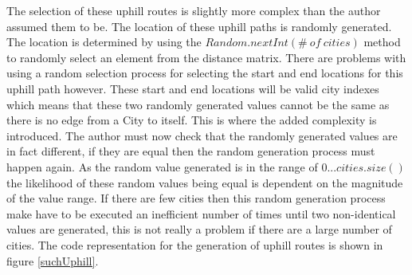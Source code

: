 The selection of these uphill routes is slightly more complex than the author assumed them to be. The location of these uphill paths is randomly generated. The location is determined by using the $Random.nextInt(\#\ of\ cities)$ method to randomly select an element from the distance matrix. There are problems with using a random selection process for selecting the start and end locations for this uphill path however. These start and end locations will be valid city indexes which means that these two randomly generated values cannot be the same as there is no edge from a City to itself. This is where the added complexity is introduced. The author must now check that the randomly generated values are in fact different, if they are equal then the random generation process must happen again. As the random value generated is in the range of $0...cities.size()$ the likelihood of these random values being equal is dependent on the magnitude of the value range. If there are few cities then this random generation process make have to be executed an inefficient number of times until two non-identical values are generated, this is not really a problem if there are a large number of cities. The code representation for the generation of uphill routes is shown in figure \ref{suchUphill}.

